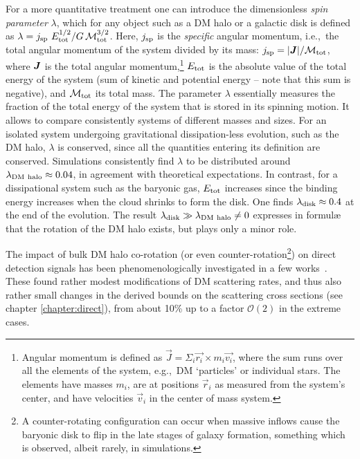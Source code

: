 \smallskip

For a more quantitative treatment one can introduce the dimensionless {\em spin parameter} $\lambda$, which for any object such as a DM halo or a galactic disk is defined as $\lambda = j_{\rm sp}\  E^{1/2}_{\rm tot}/  G \, {\mathcal{M}} ^{3/2}_{\rm tot}$. Here, $j_{\rm sp}$ is the {\em specific} angular momentum, i.e.,~the total angular momentum of the system divided by its mass: 
$j_{\rm sp} = |\bm{J}|/{\mathcal{M}}_{\rm tot}$, 
where $\bm{J}$ is the total angular momentum,\footnote{Angular momentum is defined as $\vec{J} = \Sigma_{i}  \vec{r_i} \times m_i\vec{v_i}$, where the sum runs over all the elements  of the system, e.g.,~DM `particles' or individual stars. The elements have masses $m_i$,  are at positions $\vec r_i$ as measured from the system's center,  and have velocities $\vec v_i$ in the center of mass system. 
} 
$E_{\rm tot}$ is the absolute value of the total energy  of the system (sum of kinetic and potential energy -- note that this sum is negative), and ${\mathcal{M}} _{\rm tot}$ its total mass. 
The parameter $\lambda$ essentially measures the fraction of the total energy of the system that is stored in its spinning motion. It allows to compare consistently systems of different masses and sizes. For an isolated system undergoing gravitational dissipation-less evolution, such as the DM halo, $\lambda$ is conserved, since all the quantities entering its definition are conserved.
Simulations consistently find $\lambda$ to be distributed around $\lambda_{\rm DM \ halo} \approx 0.04$, in agreement with theoretical expectations. 
In contrast, for a dissipational system such as the baryonic gas, $E_{\rm tot}$ increases since the binding energy increases when the cloud shrinks to form the disk. 
One finds $\lambda_{\rm disk} \approx 0.4$ at the end of the evolution. 
The result $\lambda_{\rm disk} \gg \lambda_{\rm DM \ halo} \neq 0$ expresses in formul\ae{} that the rotation of the DM halo exists, but plays only a minor role.
 

The impact of bulk DM halo co-rotation (or even counter-rotation\footnote{A counter-rotating configuration can occur when massive inflows cause the baryonic disk to flip in the late stages of galaxy formation, something which is observed, albeit rarely, in simulations.}) on direct detection signals has been phenomenologically investigated in a few works~\cite{corotation}. These found  rather modest modifications of DM scattering rates, and thus also rather small changes in the derived bounds on the scattering cross sections (see chapter \ref{chapter:direct}),  from about 10\% up to a factor ${\mathcal O}(2)$ in the extreme cases. 

